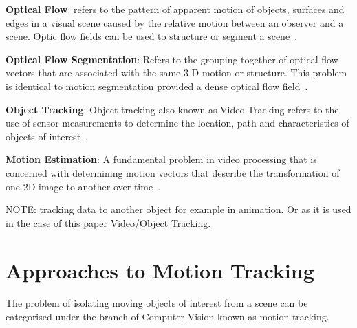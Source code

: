 \textbf{Optical Flow}: refers to the pattern of apparent motion of objects, surfaces and
edges in a visual scene caused by the relative motion between an observer and a
scene. Optic flow fields can be used to structure or segment a scene~\cite{Forsyth2012}.

\textbf{Optical Flow Segmentation}: Refers to the grouping together of optical flow
vectors that are associated with the same 3-D motion or structure. This problem
is identical to motion segmentation provided a dense optical flow field~\cite{Tekalp2014}.

\textbf{Object Tracking}: Object tracking also known as Video Tracking refers to the use
of sensor measurements to determine the location, path and characteristics of
objects of interest~\cite{Challa2011}.
 
\textbf{Motion Estimation}: A fundamental problem in video processing that is concerned
with determining motion vectors that describe the transformation of one 2D
image to another over time~\cite{Tekalp2014}.

NOTE:\@
tracking data to another object for example in animation. Or as it is used in the
case of this paper Video/Object Tracking.

\section{Approaches to Motion Tracking}\label{literature_review_general_approach}
The problem of isolating moving objects of interest from a scene can
be categorised under the branch of Computer Vision known as motion
tracking.

